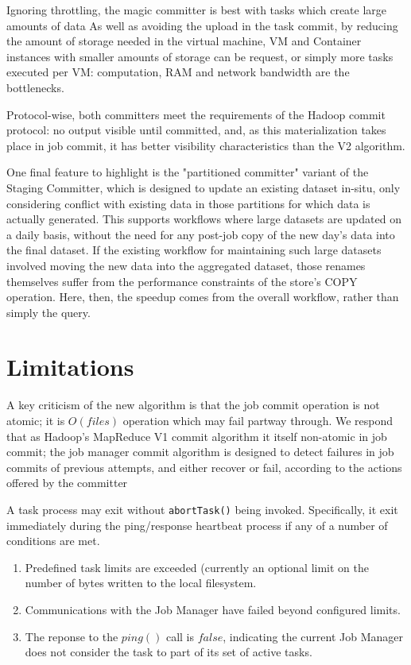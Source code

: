 \documentclass[conference]{IEEEtran}
\begin{document}
Ignoring throttling, the magic committer is best with tasks which create
large amounts of data
As well as avoiding the upload in the task commit, by reducing the
amount of storage needed in the virtual machine, VM and Container instances
with smaller amounts of storage can be request, or simply more tasks executed
per VM: computation, RAM and network bandwidth are the bottlenecks.

Protocol-wise, both committers meet the requirements of the Hadoop commit
protocol: no output visible until committed, and, as this materialization
takes place in job commit, it has better visibility characteristics than
the V2 algorithm.

One final feature to highlight is the "partitioned committer" variant
of the Staging Committer, which is designed to update an existing
dataset in-situ, only considering conflict with existing data in
those partitions for which data is actually generated.
This supports workflows where large datasets are updated on a daily basis,
without the need for any post-job copy of the new day's data into the
final dataset.
If the existing workflow for maintaining such large datasets involved
moving the new data into the aggregated dataset, those renames themselves
suffer from the performance constraints of the store's COPY operation.
Here, then, the speedup comes from the overall workflow, rather than
simply the query.






\section{Limitations}
\label{sec:limitations}

A key criticism of the new algorithm is that the job commit operation is not atomic;
it is $O(files)$ operation which may fail partway through.
We respond that as Hadoop's MapReduce V1 commit algorithm it itself non-atomic in job commit;
the job manager commit algorithm is designed to detect failures in job commits
of previous attempts, and either recover or fail, according to the actions
offered by the committer

A task process may exit without \texttt{abortTask()} being invoked.
Specifically, it exit immediately during the ping/response
heartbeat process if any of a number of conditions are met.

\begin{enumerate}
  \item Predefined task limits are exceeded
  (currently an optional limit on the number of bytes written to the local filesystem.
  \item Communications with the Job Manager have failed beyond configured limits.
  \item The reponse to the $ping()$ call is $false$, indicating the current
  Job Manager does not consider the task to part of its set of active tasks.
\end{enumerate}
\end{document}
